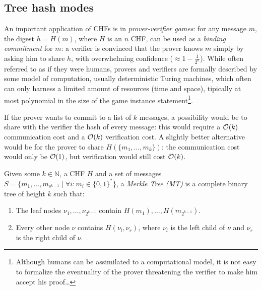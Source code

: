 \subsection{Tree hash modes}
An important application of CHFs is in \emph{prover-verifier games}:
for any message \(m\), the digest \(h = H(m)\), where \(H\) is an \(n\) CHF, can be
used as a \emph{binding commitment} for \(m\): a verifier is convinced that the prover knows \(m\)
simply by asking him to share \(h\), with overwhelming confidence (\(\approx 1 - \frac{1}{2^n}\)).
While often referred to as if they were humans, provers and verifiers are formally described by
some model of computation, usually deterministic Turing machines, which often can only harness a
limited amount of resources (time and space), tipically at most polynomial in the size of the game
instance statement\footnote{Although humans can be  assimilated to a computational model, it is
	not easy to formalize the eventuality of the prover threatening the verifier to make him accept
	his proof\dots}.

If the prover wants to commit to a list of \(k\) messages, a possibility would be to share with the
verifier the hash of every message: this would require a \(\mathcal{O}(k)\) communication cost and a
\(\mathcal{O}(k)\) verification cost.
A slightly better alternative would be for the prover to share \(H(\{m_1, \dots, m_k\})\): the
communication cost would only be \(\mathcal{O}(1)\), but verification would still cost \(\mathcal{O}(k)\).
\begin{definition}
	Given some \(k \in \mathbb{N}\), a CHF \(H\) and a set of messages
	\(S = \{m_1, \dots, m_{s^{k-1}} \mid \forall i\colon m_i \in {\{0, 1\}}^*\} \),
	a \emph{Merkle Tree (MT)} is a complete binary tree of height \(k\) such that:
	\begin{enumerate}
		\item The leaf nodes \(\nu_1, \dots, \nu_{2^{k-1}}\) contain \(H(m_1), \dots,
		      H(m_{2^{k-1}})\).
		\item Every other node \(\nu \) contains \(H(\nu_l, \nu_r)\), where \(\nu_l\) is the left
		      child of \(\nu \) and \(\nu_r\) is the right child of \(\nu \).
	\end{enumerate}
\end{definition}

